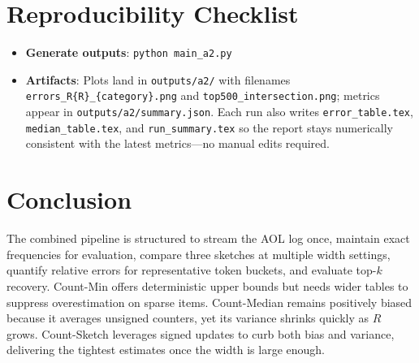 \documentclass[11pt]{article}
\begin{document}
\section{Reproducibility Checklist}
\begin{itemize}
  \item \textbf{Generate outputs}: \verb|python main_a2.py|\ 
  \item \textbf{Artifacts}: Plots land in \texttt{outputs/a2/} with filenames \texttt{errors\_R\{R\}\_\{category\}.png} and \texttt{top500\_intersection.png}; metrics appear in \texttt{outputs/a2/summary.json}. Each run also writes \texttt{error\_table.tex}, \texttt{median\_table.tex}, and \texttt{run\_summary.tex} so the report stays numerically consistent with the latest metrics—no manual edits required.
\end{itemize}

\section{Conclusion}
The combined pipeline is structured to stream the AOL log once, maintain exact frequencies for evaluation, compare three sketches at multiple width settings, quantify relative errors for representative token buckets, and evaluate top-$k$ recovery. Count-Min offers deterministic upper bounds but needs wider tables to suppress overestimation on sparse items. Count-Median remains positively biased because it averages unsigned counters, yet its variance shrinks quickly as $R$ grows. Count-Sketch leverages signed updates to curb both bias and variance, delivering the tightest estimates once the width is large enough.
\end{document}
